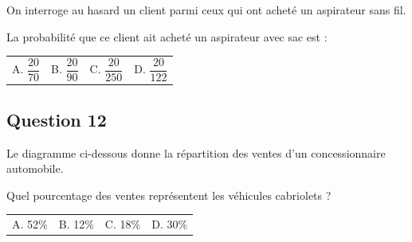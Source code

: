 \documentclass[10pt]{article}
\begin{document}
On interroge au hasard un client parmi ceux qui ont acheté un aspirateur sans fil.\par
La probabilité que ce client ait acheté un aspirateur avec sac est :
\begin{center}
\begin{tabularx}{.92\linewidth}{XXXX} A. $\dfrac{20}{70}$ & B. $\dfrac{20}{90}$ & C. $\dfrac{20}{250}$ & D. $\dfrac{20}{122}$\end{tabularx}
\end{center}


\subsection*{Question 12}

Le diagramme ci-dessous donne la répartition des ventes d'un concessionnaire automobile.
\begin{center}
\end{center}

Quel pourcentage des ventes représentent les véhicules cabriolets ?
\begin{center}
\begin{tabularx}{.92\linewidth}{XXXX} A. 52\% & B. 12\% & C. 18\% & D. 30\%\end{tabularx}
\end{center}

\vspace{1em}
\end{document}
